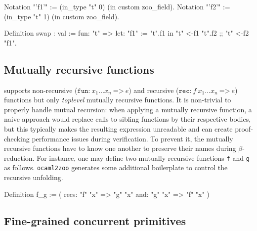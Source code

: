 \begin{coqcode}
Notation "'f1'" := (in_type "t" 0) (in custom zoo_field).
Notation "'f2'" := (in_type "t" 1) (in custom zoo_field).

Definition swap : val := fun: "t" =>
  let: "f1" := "t".{f1} in
  "t" <-{f1} "t".{f2} ;; "t" <-{f2} "f1".
\end{coqcode}

\subsection{Mutually recursive functions}

\Zoo supports non-recursive ($\texttt{fun:}\ x_1 \dots x_n\ \texttt{=>}\ e$) and recursive ($\texttt{rec:}\ f\ x_1 \dots x_n\ \texttt{=>}\ e$) functions but only \emph{toplevel} mutually recursive functions.
It is non-trivial to properly handle mutual recursion: when applying a mutually recursive function, a naive approach would replace calls to sibling functions by their respective bodies, but this typically makes the resulting expression unreadable and can create proof-checking performance issues during verification.
To prevent it, the mutually recursive functions have to know one another to preserve their names during $\beta$-reduction.
For instance, one may define two mutually recursive functions \texttt{f} and \texttt{g} as follows.
\texttt{ocaml2zoo} generates some additional boilerplate to control the recursive unfolding.

\begin{coqcode}
Definition f_g := (
  recs: "f" "x" => "g" "x"
  and:  "g" "x" => "f" "x"
)%
\end{coqcode}

\subsection{Fine-grained concurrent primitives}
\label{sec:atomic}

